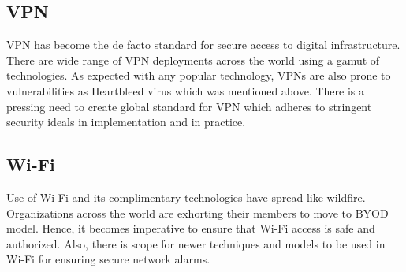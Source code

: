 \documentclass[letterpaper, 10 pt, conference]{ieeeconf}
\begin{document}
\subsection{\textbf{VPN}}

VPN has become the de facto standard for secure access to digital infrastructure. There are wide range of VPN deployments across the world using a gamut of technologies. As expected with any popular technology, VPNs are also prone to vulnerabilities as Heartbleed virus which was mentioned above. There is a pressing need to create global standard for VPN which adheres to stringent security ideals in implementation and in practice.\\


\subsection{\textbf{Wi-Fi}}
Use of Wi-Fi and its complimentary technologies have spread like wildfire. Organizations across the world are exhorting their members to move to BYOD model. Hence, it becomes imperative to ensure that Wi-Fi access is safe and authorized.
Also, there is scope for newer techniques and models to be used in Wi-Fi for ensuring secure network alarms.\\

\addtolength{\textheight}{-12cm}   
\end{document}
